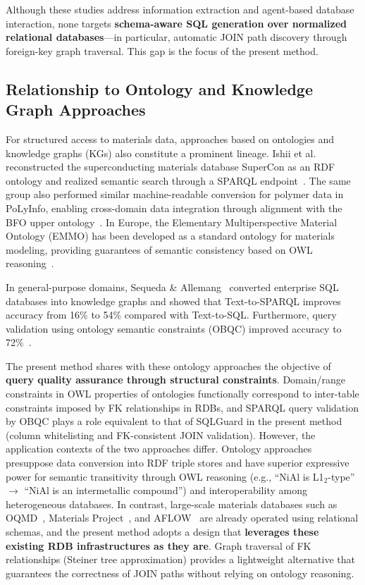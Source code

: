 \documentclass[5p,twocolumn]{elsarticle}
\begin{document}
Although these studies address information extraction and agent-based database interaction,
none targets \textbf{schema-aware SQL generation over normalized relational databases}---in particular,
automatic JOIN path discovery through foreign-key graph traversal.
This gap is the focus of the present method.

\subsection{Relationship to Ontology and Knowledge Graph Approaches}
\label{sec:ontology_comparison}

For structured access to materials data,
approaches based on ontologies and knowledge graphs (KGs) also constitute a prominent lineage.
Ishii et al. reconstructed the superconducting materials database SuperCon as an RDF ontology and
realized semantic search through a SPARQL endpoint~\citep{ishii2023supercon}.
The same group also performed similar machine-readable conversion for polymer data in PoLyInfo,
enabling cross-domain data integration through alignment with the BFO upper ontology~\citep{ishii2024polyinfo}.
In Europe, the Elementary Multiperspective Material Ontology (EMMO) has been developed
as a standard ontology for materials modeling,
providing guarantees of semantic consistency based on OWL reasoning~\citep{emmo2020}.

In general-purpose domains, Sequeda \& Allemang~\citep{sequeda2024benchmark} converted
enterprise SQL databases into knowledge graphs and showed that
Text-to-SPARQL improves accuracy from 16\% to 54\% compared with Text-to-SQL.
Furthermore, query validation using ontology semantic constraints (OBQC) improved accuracy to
72\%~\citep{allemang2024obqc}.

The present method shares with these ontology approaches the objective of
\textbf{query quality assurance through structural constraints}.
Domain/range constraints in OWL properties of ontologies functionally correspond to
inter-table constraints imposed by FK relationships in RDBs, and
SPARQL query validation by OBQC plays a role equivalent to that of
SQLGuard in the present method (column whitelisting and FK-consistent JOIN validation).
However, the application contexts of the two approaches differ.
Ontology approaches presuppose data conversion into RDF triple stores and
have superior expressive power for semantic transitivity through OWL reasoning
(e.g., ``NiAl is L1$_2$-type'' $\to$ ``NiAl is an intermetallic compound'') and
interoperability among heterogeneous databases.
In contrast, large-scale materials databases such as OQMD~\citep{saal2013oqmd}, Materials Project~\citep{jain2013mp}, and AFLOW~\citep{curtarolo2012aflow}
are already operated using relational schemas, and
the present method adopts a design that \textbf{leverages these existing RDB infrastructures as they are}.
Graph traversal of FK relationships (Steiner tree approximation) provides
a lightweight alternative that guarantees the correctness of JOIN paths without relying on ontology reasoning.
\end{document}
